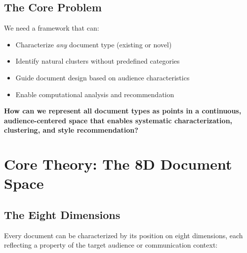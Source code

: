 \subsection{The Core Problem}

We need a framework that can:
\begin{itemize}[nosep]
\item Characterize \textit{any} document type (existing or novel)
\item Identify natural clusters without predefined categories
\item Guide document design based on audience characteristics
\item Enable computational analysis and recommendation
\end{itemize}

\begin{tcolorbox}[colback=red!5!white, colframe=red!75!black,
    title=The Fundamental Question]
\textbf{How can we represent all document types as points in a continuous,
audience-centered space that enables systematic characterization, clustering,
and style recommendation?}
\end{tcolorbox}


\section{Core Theory: The 8D Document Space}
\label{sec:doctype-theory}

\subsection{The Eight Dimensions}

Every document can be characterized by its position on eight dimensions,
each reflecting a property of the target audience or communication context:

